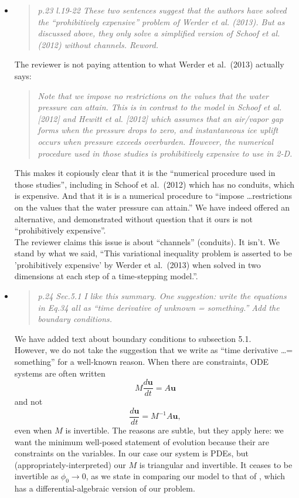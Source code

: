 \documentclass[11pt,reqno]{amsart}
\newcommand{\reply}[2]{
\medskip\medskip
\item  \begin{quote}
\emph{#1}
\end{quote}

\medskip
\noindent #2}
\begin{document}
\begin{itemize}
\reply{p.23 l.19-22 These two sentences suggest that the authors have solved the ``prohibitively expensive'' problem of Werder et al. (2013).  But as discussed above, they only solve a simplified version of Schoof et al. (2012) without channels.  Reword.}
{The reviewer is not paying attention to what Werder et al.~(2013) \cite{Werderetal2013} actually says:
\smallskip
\begin{quote}
\emph{Note that we impose no restrictions on the values that the water pressure can attain. This is in contrast to the model in Schoof et al. [2012] and Hewitt et al. [2012] which assumes that an air/vapor gap forms when the pressure drops to zero, and instantaneous ice uplift occurs when pressure exceeds overburden. However, the numerical procedure used in those studies is prohibitively expensive to use in 2-D.}
\end{quote}
This makes it copiously clear that it is the ``numerical procedure used in those studies'', including in Schoof et al.~(2012) which has no conduits, which is expensive.  And that it is is a numerical procedure to ``impose \dots restrictions on the values that the water pressure can attain.''  We have indeed offered an alternative, and demonstrated without question that it ours is not ``prohibitively expensive''.\\
\indent The reviewer claims this issue is about ``channels'' (conduits).  It isn't.  We stand by what we said, ``This variational inequality problem is asserted to be 'prohibitively expensive' by Werder et al.~(2013) when solved in two dimensions at each step of a time-stepping model.''.}

\reply{p.24 Sec.5.1 I like this summary. One suggestion: write the equations in Eq.34 all as
``time derivative of unknown = something.'' Add the boundary conditions.}
{We have added text about boundary conditions to subsection 5.1.\\
\indent However, we do not take the suggestion that we write as ``time derivative \dots = something'' for a well-known reason.  When there are constraints, ODE systems are often written
    $$M\frac{d\mathbf{u}}{dt} = A \mathbf{u}$$
and not
    $$\frac{d\mathbf{u}}{dt} = M^{-1} A \mathbf{u},$$
even when $M$ is invertible.  The reasons are subtle, but they apply here: we want the minimum well-posed statement of evolution because their are constraints on the variables.  In our case our system is PDEs, but (appropriately-interpreted) our $M$ is triangular and invertible.  It ceases to be invertible as $\phi_0\to 0$, as we state in comparing our model to that of \cite{Schoofetal2012}, which has a differential-algebraic version of our problem.}


\end{itemize}
\end{document}
